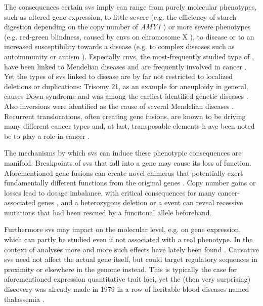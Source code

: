 The consequences certain \acp{sv} imply can range from purely molecular
phenotypes, such as altered gene expression, to little severe (e.g. the efficiency of
starch digestion depending on the copy number of \textit{AMY1} \citep{Perry2007})
or more severe phenotypes (e.g. red-green blindness, caused by \acp{cnv} on
chromosome X \citep{Nathans1986}), to disease or to an increased susceptibility
towards a disease (e.g. to complex diseases such as autoimmunity
\citep{Fanciulli2007} or autism \citep{Sebat2007}). Especially \acp{cnv}, the
most-frequently studied type of \sv, have been linked to Mendelian diseases
\citep[see table 2]{Zhang2009} and are frequently involved in cancer
\citep{Beroukhim2010}. Yet the types of \acp{sv} linked to disease are by far
not restricted to localized deletions or duplications: Trisomy 21, as an example
for aneuploidy in general, causes Down syndrome and was among the earliest
identified genetic diseases \citep{Lejeune1959}. Also inversions were identified
as the cause of several Mendelian diseases \citep{Feuk2010}. Recurrent
translocations, often creating gene fusions, are known to be driving many
different cancer types \citep{Mertens2015} and, at last, transposable elements h
ave been noted be to play a role in cancer \citep{Burns2017}.

The mechanisms by which \acp{sv} can induce these phenotypic consequences are
manifold. Breakpoints of \acp{sv} that fall into a gene may cause its loss
of function. Aforementioned gene fusions can create novel chimeras that
potentially exert fundamentally different functions from the original genes
\citep{Mertens2015}. Copy number gains or losses lead to dosage imbalance, with
critical consequences for many cancer-associated genes \citep{Fehrmann2015}, and
a heterozygous deletion or a \loh event can reveal recessive mutations
that had been rescued by a funcitonal allele beforehand.

Furthermore \acp{sv} may impact on the molecular level, e.g. on gene expression,
which can partly be studied even if not associated with a real phenotype. In
the context of  analyses
more and more such effects have lately been found \citep{Sudmant2015,Chiang2017}.
Causative \acp{sv} need not affect the actual gene itself, but could target
regulatory sequences in proximity or elsewhere in the genome instead. This is
typically the case for aforementioned expression quantitative trait loci, yet
the (then very surprising) discovery was already made in 1979 in a row of
heritable blood diseases named thalassemia \citep{Fritsch1979}.

